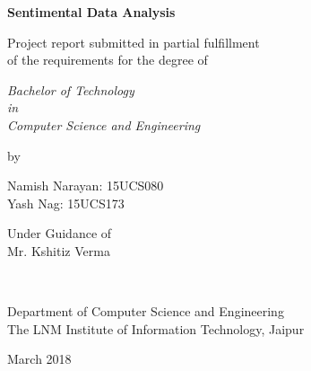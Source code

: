 \thispagestyle{empty}
\begin{center}
{\Large \bf Sentimental Data Analysis }

\vspace*{1.75cm}
{\large Project report submitted in partial fulfillment\\}
{\large  of the requirements for the degree of \\}

\vspace*{1cm}
{\it {\large Bachelor of Technology} \\
{\large in\\}
{\large Computer Science and Engineering \\}}

\vspace*{1cm}
{\large by}

\vspace*{1cm}
{\large Namish Narayan: 15UCS080\\}
{\large Yash Nag: 15UCS173 \\}


\vspace*{5mm}
{\large Under Guidance of \\}
{\large Mr. Kshitiz Verma \\}

\vspace*{1.0cm}
{\\}

\vspace*{2.0cm}
{\large Department of Computer Science and Engineering \\}
{\large The LNM Institute of Information Technology, Jaipur\\}

\vspace*{1.0cm}
{\large March 2018\\}
\end{center}

